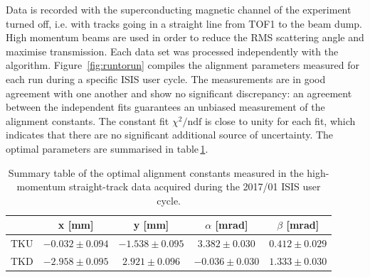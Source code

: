 Data is recorded with the superconducting magnetic channel of the experiment turned off, i.e. with tracks going in a straight line from TOF1 to the beam dump. High momentum beams are used in order to reduce the RMS scattering angle and maximise transmission.  
Each data set was processed independently with the algorithm. Figure~\ref{fig:runtorun} compiles the alignment parameters measured for each run during a specific ISIS user cycle. The measurements are in good agreement with one another and show no significant discrepancy: an agreement between the independent fits guarantees an unbiased measurement of the alignment constants. The constant fit $\chi^2/\text{ndf}$ is close to unity for each fit, which indicates that there are no significant additional source of uncertainty. The optimal parameters are summarised in table\,\ref{tab:201701_constants}. 

\begin{table}[ht!]
	\centering
		\begin{tabular}{l|c|c|c|c}
			& x [mm] & y [mm] & $\alpha$ [mrad] & $\beta$ [mrad] \\
			\hline
			TKU & $-0.032\pm0.094$ & $-1.538\pm0.095$ & $ 3.382\pm0.030$ & $0.412\pm0.029$ \\
			TKD & $-2.958\pm0.095$ & $ 2.921\pm0.096$ & $-0.036\pm0.030$ & $1.333\pm0.030$
		\end{tabular}
	\caption{Summary table of the optimal alignment constants measured in the high-momentum straight-track data acquired during the 2017/01 ISIS user cycle.}
	\label{tab:201701_constants}
\end{table}


